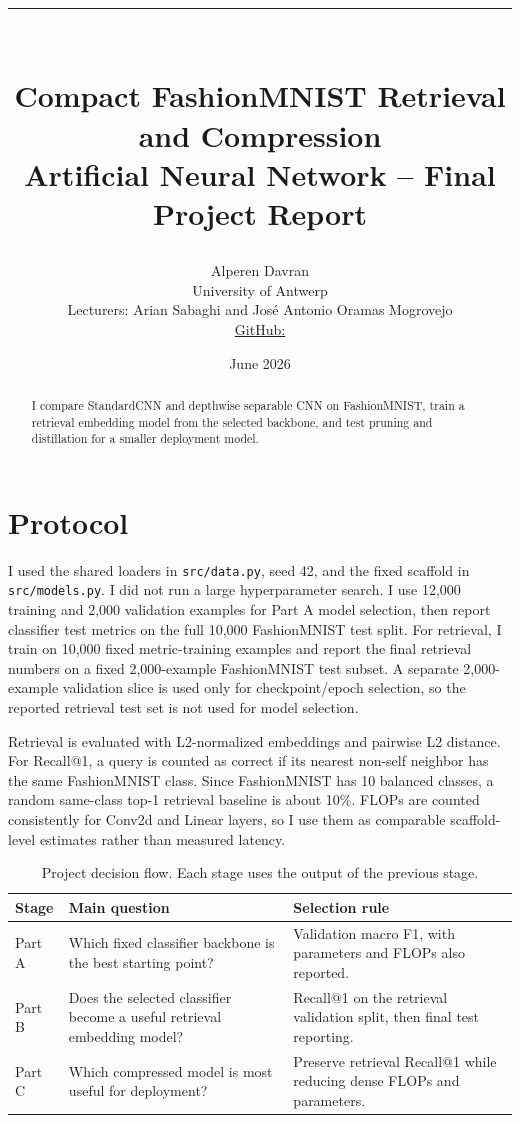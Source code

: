 \documentclass[11pt,a4paper]{article}
\title{\vspace{-1.2cm}
{\color{uantwerpred}\rule{\linewidth}{1.2pt}}\\[0.35cm]
\textbf{Compact FashionMNIST Retrieval and Compression}\\
\large Artificial Neural Network -- Final Project Report}
\author{Alperen Davran\\
University of Antwerp\\
Lecturers: Arian Sabaghi and Jos\'e Antonio Oramas Mogrovejo\\
\href{\githuburl}{GitHub: \githuburl}}
\date{June 2026}
\newcommand{\model}[1]{\texttt{#1}}
\begin{document}
\maketitle

\begin{abstract}
I compare StandardCNN and depthwise separable CNN on FashionMNIST, train a retrieval embedding model from the selected backbone, and test pruning and distillation for a smaller deployment model.
\end{abstract}

\section{Protocol}

I used the shared loaders in \model{src/data.py}, seed 42, and the fixed scaffold in \model{src/models.py}. I did not run a large hyperparameter search. I use 12,000 training and 2,000 validation examples for Part A model selection, then report classifier test metrics on the full 10,000 FashionMNIST test split. For retrieval, I train on 10,000 fixed metric-training examples and report the final retrieval numbers on a fixed 2,000-example FashionMNIST test subset. A separate 2,000-example validation slice is used only for checkpoint/epoch selection, so the reported retrieval test set is not used for model selection.

Retrieval is evaluated with L2-normalized embeddings and pairwise L2 distance. For Recall@1, a query is counted as correct if its nearest non-self neighbor has the same FashionMNIST class. Since FashionMNIST has 10 balanced classes, a random same-class top-1 retrieval baseline is about 10\%. FLOPs are counted consistently for Conv2d and Linear layers, so I use them as comparable scaffold-level estimates rather than measured latency.

\begin{table}[H]
\centering
\small
\begin{tabularx}{\linewidth}{p{2.5cm}X X}
\toprule
\textbf{Stage} & \textbf{Main question} & \textbf{Selection rule} \\
\midrule
Part A & Which fixed classifier backbone is the best starting point? & Validation macro F1, with parameters and FLOPs also reported. \\
Part B & Does the selected classifier become a useful retrieval embedding model? & Recall@1 on the retrieval validation split, then final test reporting. \\
Part C & Which compressed model is most useful for deployment? & Preserve retrieval Recall@1 while reducing dense FLOPs and parameters. \\
\bottomrule
\end{tabularx}
\caption{Project decision flow. Each stage uses the output of the previous stage.}
\end{table}
\end{document}
